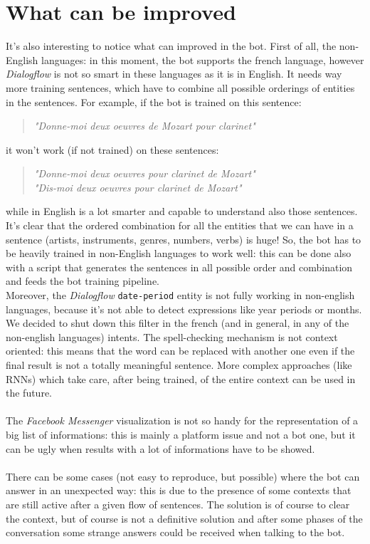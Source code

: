 	\section{What can be improved}
	It's also interesting to notice what can improved in the bot. First of all, the non-English languages: in this moment, the bot supports the french language, however \textit{Dialogflow} is not so smart in these languages as it is in English. It needs way more training sentences, which have to combine all possible orderings of entities in the sentences. For example, if the bot is trained on this sentence:
	\begin{verse}
		\textit{"Donne-moi deux oeuvres de Mozart pour clarinet"}
	\end{verse}
	it won't work (if not trained) on these sentences:
	\begin{verse}
		\textit{"Donne-moi deux oeuvres pour clarinet de Mozart"}\\
		\textit{"Dis-moi deux oeuvres pour clarinet de Mozart"}
	\end{verse}
	while in English is a lot smarter and capable to understand also those sentences. It's clear that the ordered combination for all the entities that we can have in a sentence (artists, instruments, genres, numbers, verbs) is huge! So, the bot has to be heavily trained in non-English languages to work well: this can be done also with a script that generates the sentences in all possible order and combination and feeds the bot training pipeline.\\
	Moreover, the \textit{Dialogflow} \texttt{date-period} entity is not fully working in non-english languages, because it's not able to detect expressions like year periods or months. We decided to shut down this filter in the french (and in general, in any of the non-english languages) intents.
	The spell-checking mechanism is not context oriented: this means that the word can be replaced with another one even if the final result is not a totally meaningful sentence. More complex approaches (like RNNs) which take care, after being trained, of the entire context can be used in the future.\\\\
	The \textit{Facebook Messenger} visualization is not so handy for the representation of a big list of informations: this is mainly a platform issue and not a bot one, but it can be ugly when results with a lot of informations have to be showed.\\\\
	There can be some cases (not easy to reproduce, but possible) where the bot can answer in an unexpected way: this is due to the presence of some contexts that are still active after a given flow of sentences. The solution is of course to clear the context, but of course is not a definitive solution and after some phases of the conversation some strange answers could be received when talking to the bot.\\\\
